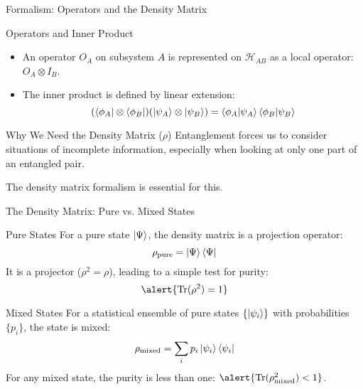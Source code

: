 \begin{frame}{Formalism: Operators and the Density Matrix}
  \begin{block}{Operators and Inner Product}
    \begin{itemize}
      \item An operator $O_A$ on subsystem $A$ is represented on
        $\mathcal{H}_{AB}$ as a \alert{local operator}: $O_A \otimes I_B$.
        \pause
      \item The inner product is defined by linear extension:
        \[
          (\bra{\phi_A} \otimes \bra{\phi_B}) (\ket{\psi_A} \otimes
          \ket{\psi_B}) = \braket{\phi_A | \psi_A} \braket{\phi_B | \psi_B}
        \]
    \end{itemize}
  \end{block}
  \pause
  \begin{alertblock}{Why We Need the Density Matrix ($\rho$)}
    Entanglement forces us to consider situations of incomplete information,
    especially when looking at only one part of an entangled pair.

    The density matrix formalism is essential for this.
  \end{alertblock}
\end{frame}


\begin{frame}{The Density Matrix: Pure vs. Mixed States}
  \begin{block}{Pure States}
    For a pure state $\ket{\Psi}$, the density matrix is a projection operator:
    \begin{equation}
      \rho_{\text{pure}} = \ket{\Psi}\bra{\Psi}
    \end{equation}
    It is a projector ($\rho^2 = \rho$), leading to a simple test for purity:
    \[
      \alert{\Tr(\rho^2) = 1}
    \]
  \end{block}
  \pause
  \vspace{-1em}
  \begin{block}{Mixed States}
    For a statistical ensemble of pure states $\{\ket{\psi_i}\}$ with
    probabilities $\{p_i\}$, the state is mixed:
    \begin{equation}
      \rho_{\text{mixed}} = \sum_i p_i \ket{\psi_i}\bra{\psi_i}
    \end{equation}
    For any mixed state, the purity is less than one:
    $\alert{\Tr(\rho_{\text{mixed}}^2) < 1}$.
  \end{block}
\end{frame}

